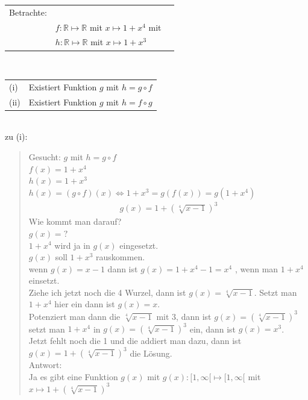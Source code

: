 \begin{tabular}[t]{lll}%
	Betrachte:&\\
	& $f:\mathbb{R}\longmapsto\mathbb{R}$ mit $x\longmapsto 1+x^4$ mit \\
	& $h:\mathbb{R}\longmapsto\mathbb{R}$ mit $x\longmapsto 1+x^3$ \\	
\end{tabular} \\
\begin{tabular}[t]{ll}%
	(i) & Existiert Funktion $g$ mit $h=g\circ f$ \\
	(ii) & Existiert Funktion $g$ mit $h=f\circ g$ \\	
\end{tabular} \vspace*{2mm}\\
zu (i):\\
\begin{quote}
	Gesucht: $g$ mit $h=g\circ f$\\
	$f(x)=1+x^4$\\
	$h(x)=1+x^3$\\
	$h(x)=(g\circ f)(x)\Leftrightarrow 1+x^3=g(f(x))=g(1+x^4) $\\
	\begin{align*}
		g(x)=1+(\sqrt[4]{x-1})^3
	\end{align*}
	Wie kommt man darauf?\\
	$g(x)=?$\\
	$1+x^4$ wird ja in  $g(x)$ eingesetzt.\\
	$g(x)$ soll $1+x^3$ rauskommen.\\
	wenn $g(x)= x-1$ dann ist $g(x)=1+x^4-1=x^4$ , wenn man $1+x^4$ einsetzt.\\
	Ziehe ich jetzt noch die 4 Wurzel, dann ist $g(x)=\sqrt[4]{x-1}$.
	Setzt man $1+x^4$ hier ein dann ist $g(x)=x$.\\
	Potenziert man dann die $\sqrt[4]{x-1}$ mit 3, dann ist $g(x)=(\sqrt[4]{x-1})^3$\\
	setzt man $1+x^4$ in $g(x)=(\sqrt[4]{x-1})^3$ ein, dann ist $g(x)=x^3$.\\
	Jetzt fehlt noch die 1 und die addiert man dazu, dann ist $g(x)=1+(\sqrt[4]{x-1})^3$ die Lösung.\\
	Antwort: \\
	Ja es gibt eine Funktion $g(x)$ mit $g(x):[1,\infty[\longmapsto[1,\infty[$ mit $x\longmapsto 1+(\sqrt[4]{x-1})^3$ 
\end{quote}
